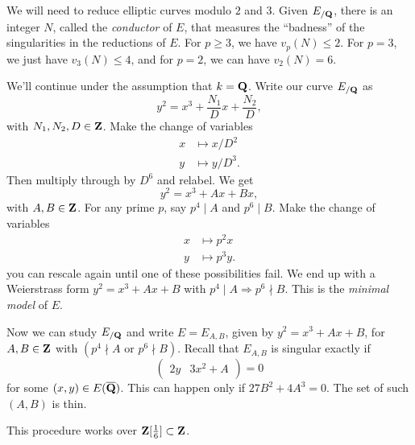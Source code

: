 We will need to reduce elliptic curves modulo $2$ and $3$. 
Given $E_{/\mathbf{Q}}$, there is an integer $N$, called the \emph{conductor} of $E$, 
that measures the ``badness'' of the singularities in the reductions of $E$. 
For $p\geqslant 3$, we have $v_p(N)\leqslant 2$. For 
$p=3$, we just have $v_3(N)\leqslant 4$, and for $p=2$, we can have 
$v_2(N)=6$. 

We'll continue under the assumption that $k=\mathbf{Q}$. Write our curve 
$E_{/\mathbf{Q}}$ as 
\[
  y^2=x^3 + \frac{N_1}{D} x + \frac{N_2}{D} ,
\]
with $N_1,N_2,D\in \mathbf{Z}$. Make the change of variables 
\begin{align*}
  x &\mapsto x/D^2 \\ 
  y &\mapsto y/D^3 .
\end{align*}
Then multiply through by $D^6$ and relabel. We get 
\[
  y^2=x^3+ A x+ B x ,
\]
with $A,B\in \mathbf{Z}$. For any prime $p$, say 
$p^4\mid A$ and $p^6\mid B$. Make the change of variables
\begin{align*}
  x &\mapsto p^2 x \\ 
  y &\mapsto p^3 y .
\end{align*}
you can rescale again until one of these possibilities fail. We end up with 
a Weierstrass form $y^2=x^3+A x+B$ with $p^4\mid A\Rightarrow p^6\nmid B$. This 
is the \emph{minimal model} of $E$. 

Now we can study $E_{/\mathbf{Q}}$ and write $E=E_{A,B}$, given by $y^2=x^3+A x+B$, 
for $A,B\in \mathbf{Z}$ with $(p^4\nmid A\text{ or }p^6\nmid B)$. Recall that 
$E_{A,B}$ is singular exactly if 
\[
  \begin{pmatrix} 2 y & 3 x^2+A\end{pmatrix} = 0
\]
for some $(x,y)\in E(\overline{\mathbf{Q}})$. This can happen only if 
$27 B^2+4 A^3=0$. The set of such $(A,B)$ is thin. 

This procedure works over $\mathbf{Z}[\frac 1 6]\subset \mathbf{Z}$. 
